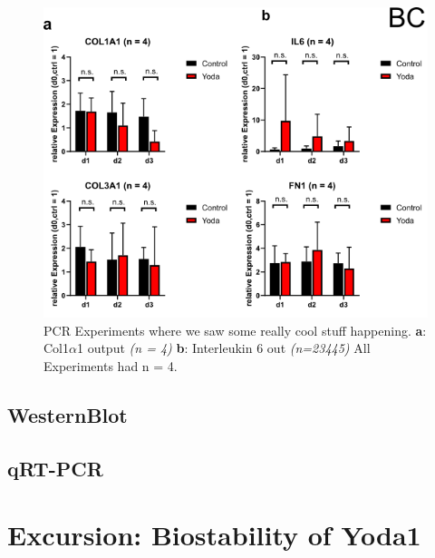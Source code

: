 \begin{figure}[ht]
    \centering
    \includegraphics[scale = 0.6]{Collection.png}
    \caption{
    PCR Experiments where we saw some really cool stuff happening. 
    \textbf{a}: Col1$\alpha$1 output \textit{(n = 4)}
    \textbf{b}: Interleukin 6 out \textit{(n=23445)}
    All Experiments had n = 4. 
    }
    \label{fig:my_label}
\end{figure}

\subsection{WesternBlot}

\subsection{qRT-PCR}

\section{Excursion: Biostability of Yoda1}
\label{sec:biostability}